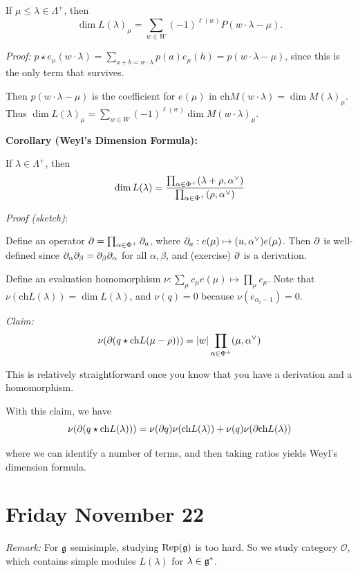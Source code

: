 If \(\mu \leq \lambda \in \Lambda^+\), then \[
\dim L(\lambda)_\mu = \sum_{w\in W} (-1)^{\ell(w)} P(w\cdot \lambda - \mu).
\]

\emph{Proof:}
\(p\star e_\mu(w \cdot \lambda) = \sum_{a+b = w\cdot \lambda} p(a) e_\mu(h) = p(w\cdot \lambda - \mu)\),
since this is the only term that survives.

Then \(p(w\cdot \lambda - \mu)\) is the coefficient for \(e(\mu)\) in
\(\mathrm{ch} M(w\cdot \lambda) = \dim M(\lambda)_\mu\). Thus
\(\dim L(\lambda)_\mu = \sum_{w\in W} (-1)^{\ell(w)} \dim M(w\cdot \lambda)_\mu\).

\textbf{Corollary (Weyl's Dimension Formula):}

If \(\lambda \in \Lambda^+\), then \[
\dim L(\lambda) = 
\frac{
\prod_{\alpha\in\Phi^+} (\lambda+\rho, \alpha^\vee)
}{
\prod_{\alpha\in\Phi^+} (\rho, \alpha^\vee)
}
\]

\emph{Proof (sketch)}:

Define an operator \({\partial} = \prod_{\alpha\in\Phi^+} {\partial}_a\), where
\({\partial}_a: e(\mu) \mapsto (u, \alpha^\vee) e(\mu)\). Then \({\partial}\) is
well-defined since \({\partial}_\alpha {\partial}_\beta = {\partial}_\beta {\partial}_\alpha\)
for all \(\alpha, \beta\), and (exercise) \({\partial}\) is a derivation.

Define an evaluation homomorphism
\(\nu: \sum_\mu c_\mu e(\mu) \mapsto \prod_\mu c_\mu\). Note that
\(\nu (\mathrm{ch} L(\lambda)) = \dim L(\lambda)\), and \(\nu(q) = 0\)
because \(\nu(e_{\alpha_i - 1}) = 0\).

\emph{Claim:} \[
\nu(
{\partial}(
q \star \mathrm{ch} L(\mu - \rho)
)
) = 
{\left\lvert {w} \right\rvert} \prod_{\alpha\in\Phi^+} (\mu, \alpha^\vee)
\]

This is relatively straightforward once you know that you have a
derivation and a homomorphism.

With this claim, we have \[
\nu({\partial}(q \star \mathrm{ch} L(\lambda))) = \nu({\partial} q) \nu(\mathrm{ch} L(\lambda)) + \nu(q) \nu({\partial} \mathrm{ch} L(\lambda))
\]

where we can identify a number of terms, and then taking ratios yields
Weyl's dimension formula.

\hypertarget{friday-november-22}{%
\section{Friday November 22}\label{friday-november-22}}

\emph{Remark:} For \({\mathfrak{g}}\) semisimple, studying
\(\mathrm{Rep}({\mathfrak{g}})\) is too hard. So we study category
\(\mathcal O\), which contains simple modules \(L(\lambda)\) for
\(\lambda \in {\mathfrak{g}}^*\).


